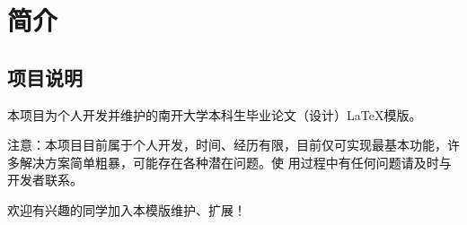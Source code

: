 \chapter{简介}

\section{项目说明}

本项目为个人开发并维护的南开大学本科生毕业论文（设计）\LaTeX{}模版。

{\heiti 注意：本项目目前属于个人开发，时间、经历有限，目前仅可实现最基本功能，许多解决方案简单粗暴，可能存在各种潜在问题。使
用过程中有任何问题请及时与开发者联系。

欢迎有兴趣的同学加入本模版维护、扩展！}




